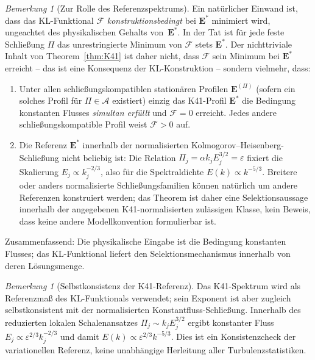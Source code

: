 \documentclass[12pt,a4paper]{article}
\theoremstyle{definition}
\theoremstyle{plain}
\theoremstyle{remark}
\newtheorem{remark}[definition]{Bemerkung}
\begin{document}
\begin{remark}[Zur Rolle des Referenzspektrums]\label{rem:circularity}
Ein natürlicher Einwand ist, dass das KL-Funktional $\mathcal{F}$
\emph{konstruktionsbedingt} bei $\mathbf{E}^*$ minimiert wird, ungeachtet
des physikalischen Gehalts von~$\mathbf{E}^*$. In der Tat ist für jede feste
Schließung $\Pi$ das unrestringierte Minimum von $\mathcal{F}$ stets
$\mathbf{E}^*$. Der nichttriviale Inhalt von Theorem~\ref{thm:K41} ist
daher nicht, dass $\mathcal{F}$ sein Minimum bei $\mathbf{E}^*$ erreicht
-- das ist eine Konsequenz der KL-Konstruktion -- sondern vielmehr, dass:
\begin{enumerate}
\item Unter allen schließungskompatiblen stationären Profilen
  $\mathbf{E}^{(\Pi)}$ (sofern ein solches Profil für
  $\Pi \in \mathscr{A}$ existiert) einzig das K41-Profil $\mathbf{E}^*$
  die Bedingung konstanten Flusses \emph{simultan erfüllt} und
  $\mathcal{F} = 0$ erreicht. Jedes andere schließungskompatible Profil
  weist $\mathcal{F} > 0$ auf.
\item Die Referenz $\mathbf{E}^*$ innerhalb der normalisierten
  Kolmogorov--Heisenberg-Schließung nicht beliebig ist: Die Relation
  $\Pi_j=\alpha k_j E_j^{3/2}=\varepsilon$ fixiert die Skalierung
  $E_j\propto k_j^{-2/3}$, also für die Spektraldichte
  $E(k)\propto k^{-5/3}$. Breitere oder anders normalisierte
  Schließungsfamilien können natürlich um andere Referenzen konstruiert
  werden; das Theorem ist daher eine Selektionsaussage innerhalb der
  angegebenen K41-normalisierten zulässigen Klasse, kein Beweis, dass keine
  andere Modellkonvention formulierbar ist.
\end{enumerate}
Zusammenfassend: Die physikalische Eingabe ist die Bedingung konstanten Flusses; das KL-Funktional
liefert den Selektionsmechanismus innerhalb von deren Lösungsmenge.
\end{remark}

\begin{remark}[Selbstkonsistenz der K41-Referenz]
\label{rem:k41-selfconsistency}
Das K41-Spektrum wird als Referenzmaß des KL-Funktionals verwendet; sein
Exponent ist aber zugleich selbstkonsistent mit der normalisierten
Konstantfluss-Schließung. Innerhalb des reduzierten lokalen Schalenansatzes
$\Pi_j\sim k_j E_j^{3/2}$ ergibt konstanter Fluss
$E_j\propto \varepsilon^{2/3}k_j^{-2/3}$ und damit
$E(k)\propto \varepsilon^{2/3}k^{-5/3}$. Dies ist ein Konsistenzcheck der
variationellen Referenz, keine unabhängige Herleitung aller
Turbulenzstatistiken.
\end{remark}
\end{document}
